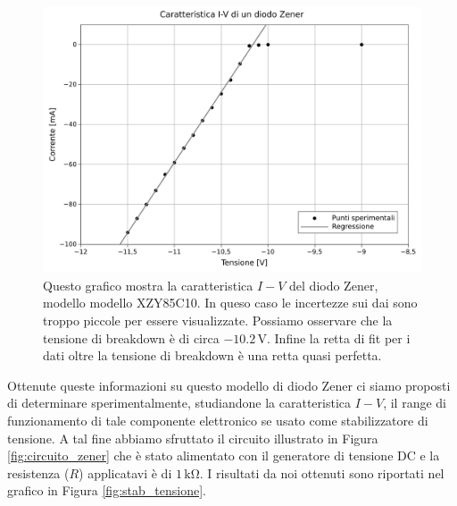 \begin{figure}
   \includegraphics[scale=0.68]{cara_zener.pdf}
    \caption{Questo grafico mostra la caratteristica $I-V$ del diodo Zener, modello modello XZY85C10. In queso caso le incertezze sui dai sono troppo piccole per essere visualizzate. Possiamo osservare che la tensione di breakdown è di circa $-10.2\,\si{\volt}$. Infine la retta di fit per i dati oltre la tensione di breakdown è una retta quasi perfetta.}
    \label{fig:caratteristica_I-V}
\end{figure}

Ottenute queste informazioni su questo modello di diodo Zener ci siamo proposti di determinare sperimentalmente, studiandone la caratteristica $I-V$, il range di funzionamento di tale componente elettronico se usato come stabilizzatore di tensione.
A tal fine abbiamo sfruttato il circuito illustrato in Figura \ref{fig:circuito_zener} che è stato alimentato con il generatore di tensione DC e la resistenza ($R$) applicatavi è di $1\,\si{\kilo\ohm}$.
I risultati da noi ottenuti sono riportati nel grafico in Figura \ref{fig:stab_tensione}.

